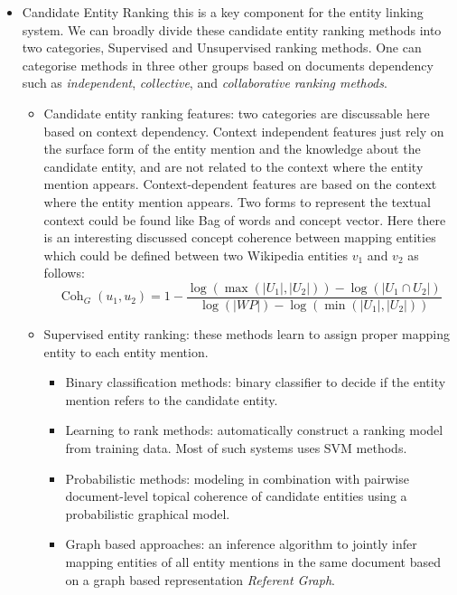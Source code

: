 \documentclass[letterpaper,12pt]{article}
\begin{document}
\begin{itemize}
\item Candidate Entity Ranking
this is a key component for the entity linking system. We can broadly divide these candidate entity ranking methods into two categories, Supervised and Unsupervised ranking methods. One can categorise methods in three other groups based on documents dependency such as \textit{independent}, \textit{collective}, and \textit{collaborative}\textit{ ranking methods}.
\begin{itemize}
    \item Candidate entity ranking features: two categories are discussable here based on context dependency. Context independent features just rely on the surface form of the entity mention and the knowledge about the candidate entity, and are not related to the context where the entity mention appears. Context-dependent features are based on the context where the entity mention appears. Two forms to represent the textual context could be found like Bag of words and concept vector. Here there is an interesting discussed concept  coherence between mapping entities which could be defined between two Wikipedia entities $v_1$ and $v_2$ as follows:
    \begin{equation}
        \operatorname { Coh } _ { G } \left( u _ { 1 } , u _ { 2 } \right) = 1 - \frac { \log \left( \max \left( \left| U _ { 1 } \right| , \left| U _ { 2 } \right| \right) \right) - \log \left( \left| U _ { 1 } \cap U _ { 2 } \right| \right) } { \log ( | W P | ) - \log \left( \min \left( \left| U _ { 1 } \right| , \left| U _ { 2 } \right| \right) \right) }
    \end{equation}
    \item Supervised entity ranking: these methods learn to assign proper mapping entity to each entity mention.
        \begin{itemize}
            \item Binary classification methods: binary classifier to decide if the entity mention refers to the candidate entity.
            \item Learning to rank methods: automatically construct a ranking model from training data. Most of such systems uses SVM methods.
            \item Probabilistic methods: modeling in combination with pairwise document-level topical coherence of candidate entities using a probabilistic graphical model.
            \item Graph based approaches: an inference algorithm to jointly infer mapping entities of all entity mentions in the same document based on a graph based representation \textit{Referent Graph}.

\end{itemize}
\end{itemize}
\end{itemize}
\end{document}
